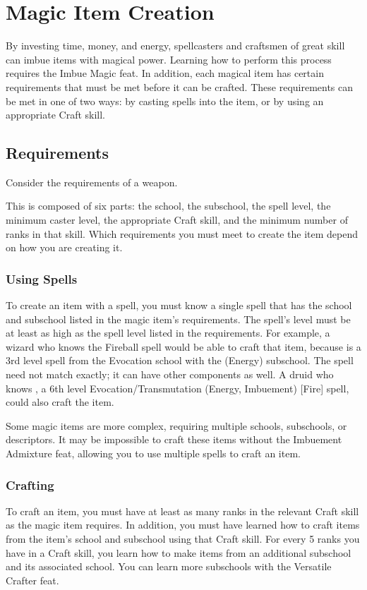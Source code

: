 \section{Magic Item Creation}\label{Magic Item Creation}\label{Creating Magic Items}

By investing time, money, and energy, spellcasters and craftsmen of great skill can imbue items with magical power. Learning how to perform this process requires the Imbue Magic feat. In addition, each magical item has certain requirements that must be met before it can be crafted. These requirements can be met in one of two ways: by casting spells into the item, or by using an appropriate Craft skill.

\subsection{Requirements}
Consider the requirements of a  weapon.


This is composed of six parts: the school, the subschool, the spell level, the minimum caster level, the appropriate Craft skill, and the minimum number of ranks in that skill. Which requirements you must meet to create the item depend on how you are creating it.

\subsubsection{Using Spells}
To create an item with a spell, you must know a single spell that has the school and subschool listed in the magic item's requirements. The spell's level must be at least as high as the spell level listed in the requirements. For example, a wizard who knows the Fireball spell would be able to craft that item, because  is a 3rd level spell from the Evocation school with the (Energy) subschool. The spell need not match exactly; it can have other components as well. A druid who knows , a 6th level Evocation/Transmutation (Energy, Imbuement) [Fire] spell, could also craft the item.

Some magic items are more complex, requiring multiple schools, subschools, or descriptors. It may be impossible to craft these items without the Imbuement Admixture feat, allowing you to use multiple spells to craft an item.

\subsubsection{Crafting}
To craft an item, you must have at least as many ranks in the relevant Craft skill as the magic item requires. In addition, you must have learned how to craft items from the item's school and subschool using that Craft skill. For every 5 ranks you have in a Craft skill, you learn how to make items from an additional subschool and its associated school. You can learn more subschools with the Versatile Crafter feat.

